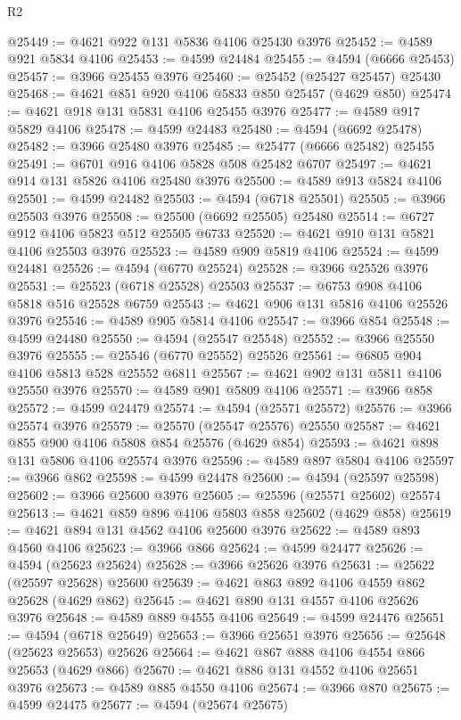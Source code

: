 \begin{lexlean}{R2}
\begin{coremodule}
@25449 := @4621 @922 @131 @5836 @4106 @25430 @3976
@25452 := @4589 @921 @5834 @4106
@25453 := @4599 @24484
@25455 := @4594 (@6666 @25453)
@25457 := @3966 @25455 @3976
@25460 := @25452 (@25427 @25457) @25430
@25468 := @4621 @851 @920 @4106 @5833 @850 @25457 (@4629 @850)
@25474 := @4621 @918 @131 @5831 @4106 @25455 @3976
@25477 := @4589 @917 @5829 @4106
@25478 := @4599 @24483
@25480 := @4594 (@6692 @25478)
@25482 := @3966 @25480 @3976
@25485 := @25477 (@6666 @25482) @25455
@25491 := @6701 @916 @4106 @5828 @508 @25482 @6707
@25497 := @4621 @914 @131 @5826 @4106 @25480 @3976
@25500 := @4589 @913 @5824 @4106
@25501 := @4599 @24482
@25503 := @4594 (@6718 @25501)
@25505 := @3966 @25503 @3976
@25508 := @25500 (@6692 @25505) @25480
@25514 := @6727 @912 @4106 @5823 @512 @25505 @6733
@25520 := @4621 @910 @131 @5821 @4106 @25503 @3976
@25523 := @4589 @909 @5819 @4106
@25524 := @4599 @24481
@25526 := @4594 (@6770 @25524)
@25528 := @3966 @25526 @3976
@25531 := @25523 (@6718 @25528) @25503
@25537 := @6753 @908 @4106 @5818 @516 @25528 @6759
@25543 := @4621 @906 @131 @5816 @4106 @25526 @3976
@25546 := @4589 @905 @5814 @4106
@25547 := @3966 @854
@25548 := @4599 @24480
@25550 := @4594 (@25547 @25548)
@25552 := @3966 @25550 @3976
@25555 := @25546 (@6770 @25552) @25526
@25561 := @6805 @904 @4106 @5813 @528 @25552 @6811
@25567 := @4621 @902 @131 @5811 @4106 @25550 @3976
@25570 := @4589 @901 @5809 @4106
@25571 := @3966 @858
@25572 := @4599 @24479
@25574 := @4594 (@25571 @25572)
@25576 := @3966 @25574 @3976
@25579 := @25570 (@25547 @25576) @25550
@25587 := @4621 @855 @900 @4106 @5808 @854 @25576 (@4629 @854)
@25593 := @4621 @898 @131 @5806 @4106 @25574 @3976
@25596 := @4589 @897 @5804 @4106
@25597 := @3966 @862
@25598 := @4599 @24478
@25600 := @4594 (@25597 @25598)
@25602 := @3966 @25600 @3976
@25605 := @25596 (@25571 @25602) @25574
@25613 := @4621 @859 @896 @4106 @5803 @858 @25602 (@4629 @858)
@25619 := @4621 @894 @131 @4562 @4106 @25600 @3976
@25622 := @4589 @893 @4560 @4106
@25623 := @3966 @866
@25624 := @4599 @24477
@25626 := @4594 (@25623 @25624)
@25628 := @3966 @25626 @3976
@25631 := @25622 (@25597 @25628) @25600
@25639 := @4621 @863 @892 @4106 @4559 @862 @25628 (@4629 @862)
@25645 := @4621 @890 @131 @4557 @4106 @25626 @3976
@25648 := @4589 @889 @4555 @4106
@25649 := @4599 @24476
@25651 := @4594 (@6718 @25649)
@25653 := @3966 @25651 @3976
@25656 := @25648 (@25623 @25653) @25626
@25664 := @4621 @867 @888 @4106 @4554 @866 @25653 (@4629 @866)
@25670 := @4621 @886 @131 @4552 @4106 @25651 @3976
@25673 := @4589 @885 @4550 @4106
@25674 := @3966 @870
@25675 := @4599 @24475
@25677 := @4594 (@25674 @25675)

\end{coremodule}
\end{lexlean}
